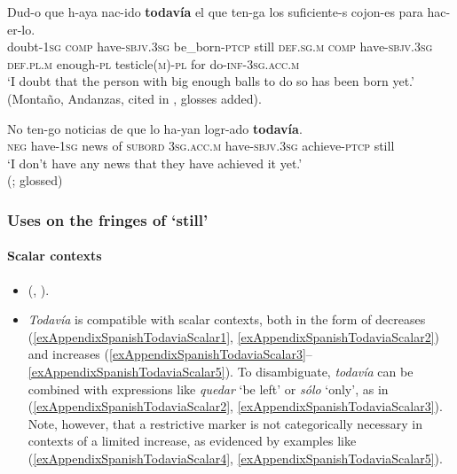 \begin{exe}

	\ex\label{exAppendixSpanishTodaviaInterrogative1}
	\gll Dud-o que h-aya nac-ido \textbf{todavía} el que ten-ga los suficiente-s cojon-es para hac-er-lo.\\
	doubt-1\textsc{sg} \textsc{comp} have-\textsc{sbjv}.3\textsc{sg} be\_born-\textsc{ptcp} still \textsc{def}.\textsc{sg}.\textsc{m} \textsc{comp} have-\textsc{sbjv}.3\textsc{sg} \textsc{def}.\textsc{pl}.\textsc{m} enough-\textsc{pl} testicle(\textsc{m})-\textsc{pl} for do-\textsc{inf}-3\textsc{sg}.\textsc{acc}.\textsc{m}\\
	\glt \lq I doubt that the person with big enough balls to do so has been born yet.' (Montaño, Andanzas, cited in \cite[§80.8m]{RAEGramatica}, glosses added).

	\ex\label{exAppendixSpanishTodaviaInterrogative2}
	\gll No ten-go noticias de que lo ha-yan logr-ado \textbf{todavía}.\\
	\textsc{neg} have-1\textsc{sg} news of \textsc{subord} 3\textsc{sg}.\textsc{acc}.\textsc{m} have-\textsc{sbjv}.3\textsc{sg} achieve-\textsc{ptcp} still\\
	\glt \lq I don't have any news that they have achieved it yet.\rq{ }
	\\(\cite[30.8m]{RAEGramatica}; glossed)
\end{exe}

\subsubsection{Uses on the fringes of \lq{}still\rq{}}
\paragraph{Scalar contexts}
\label{appendixSpanishTodaviaScalar}
\begin{itemize}
	\item \citeauthor{Garrido1992} (\citeyear{Garrido1992}, \citeyear{Garrido1993}).
 \item \textit{Todavía} is compatible with scalar contexts, both in the form of decreases  (\ref{exAppendixSpanishTodaviaScalar1}, \ref{exAppendixSpanishTodaviaScalar2}) and increases (\ref{exAppendixSpanishTodaviaScalar3}– \ref{exAppendixSpanishTodaviaScalar5}). To disambiguate, \textit{todavía} can be combined with expressions like \textit{quedar} \lq be left\rq{} or \textit{sólo} \lq only\rq{}, as in (\ref{exAppendixSpanishTodaviaScalar2}, \ref{exAppendixSpanishTodaviaScalar3}). Note, however, that a restrictive marker is not categorically necessary in contexts of a limited increase, as evidenced by examples like (\ref{exAppendixSpanishTodaviaScalar4}, \ref{exAppendixSpanishTodaviaScalar5}). 
\end{itemize}

